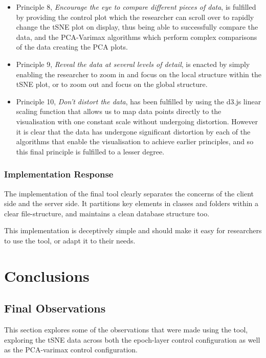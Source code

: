 \documentclass[a4paper,11pt,titlepage]{article}
\begin{document}
\begin{itemize}
		\item Principle 8, \textit{Encourage the eye to compare different pieces of data}, is fulfilled by providing the control plot which the researcher can scroll over to rapidly change the tSNE plot on display, thus being able to successfully compare the data, and the PCA-Varimax algorithms which perform complex comparisons of the data creating the PCA plots.
		\item Principle 9, \textit{Reveal the data at several levels of detail}, is enacted by simply enabling the researcher to zoom in and focus on the local structure within the tSNE plot, or to zoom out and focus on the global structure.
		\item Principle 10, \textit{Don't distort the data}, has been fulfilled by using the d3.js linear scaling function that allows us to map data points directly to the visualisation with one constant scale without undergoing distortion. However it is clear that the data has undergone significant distortion by each of the algorithms that enable the visualisation to achieve earlier principles, and so this final principle is fulfilled to a lesser degree.
	\end{itemize}
	
	\subsubsection{Implementation Response}
	The implementation of the final tool clearly separates the concerns of the client side and the server side. It partitions key elements in classes and folders within a clear file-structure, and maintains a clean database structure too. 
	\par 
	This implementation is deceptively simple and should make it easy for researchers to use the tool, or adapt it to their needs.
	
\clearpage 

\section{Conclusions}
	
	\subsection{Final Observations}
	This section explores some of the observations that were made using the tool, exploring the tSNE data across both the epoch-layer control configuration as well as the PCA-varimax control configuration.
	
\end{document}
